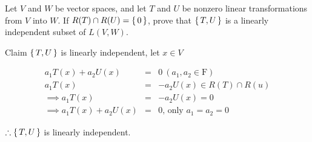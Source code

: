 Let $V$ and $W$ be vector spaces, and let $T$ and $U$ be nonzero linear transformations from $V$ into $W$. If $R(T) \cap R(U) = \left\{ \,0 \,\right\}$, prove that $\left\{ \,T,U \,\right\}$ is a linearly independent subset of $L(V,W)$.

\begin{tcolorbox}
	Claim $\left\{ \,T,U \,\right\}$ is linearly independent, let $x \in V$
	
	\begin{eqnarray*}
		a_1T(x) + a_2 U(x) &=& 0 ~(a_1,a_2 \in \mathrm{F})\\
		a_1T(x) &=& -a_2U(x) \in R(T) \cap R(u)\\
		\implies a_1T(x) &=&  -a_2U(x) = 0\\
		\implies a_1T(x) + a_2U(x) &=& 0 \text{, only $a_1 = a_2 = 0$}
	\end{eqnarray*}
	
	$\therefore \left\{ \,T,U \,\right\}$ is linearly independent.
	
\end{tcolorbox}